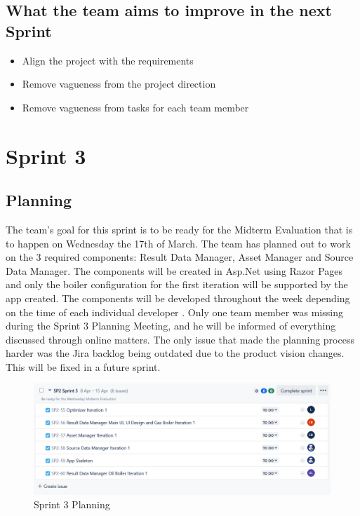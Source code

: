 \documentclass[12pt]{report}
\begin{document}
\subsection*{What the team aims to improve in the next Sprint}
\begin{itemize}
    \item Align the project with the requirements
    \item Remove vagueness from the project direction
    \item Remove vagueness from tasks for each team member
\end{itemize}
\clearpage




\section{Sprint 3}
\subsection*{Planning}
The team's goal for this sprint is to be ready for the Midterm Evaluation that is to happen on
Wednesday the 17th of March. The team has planned out to work on the 3 required components:
Result Data Manager, Asset Manager and Source Data Manager. The components will be created in
Asp.Net using Razor Pages and only the boiler configuration for the first iteration will be supported
by the app created. The components will be developed throughout the week depending on the time
of each individual developer . Only one team member was missing during the Sprint 3 Planning
Meeting, and he will be informed of everything discussed through online matters. The only issue that
made the planning process harder was the Jira backlog being outdated due to the product vision
changes. This will be fixed in a future sprint.

\begin{figure}[H]
  \centering
  \includegraphics[width=1\textwidth]{Resources/3-Sprint/Planning/Sprint3Planning.png}
  \caption{Sprint 3 Planning}
  \label{fig:S3Planning-image}
\end{figure}
\clearpage
\end{document}
